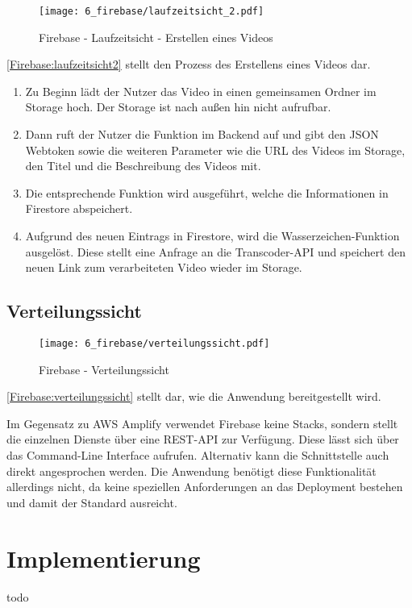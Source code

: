 \begin{figure}
  \centering
  \texttt{[image: 6\_firebase/laufzeitsicht\_2.pdf]}
  \caption{Firebase - Laufzeitsicht - Erstellen eines Videos}
  \label{Firebase:laufzeitsicht2}
\end{figure}

\autoref{Firebase:laufzeitsicht2} stellt den Prozess des Erstellens eines Videos dar.
\begin{enumerate}
  \item{Zu Beginn lädt der Nutzer das Video in einen gemeinsamen Ordner im Storage hoch. Der Storage ist nach außen hin nicht aufrufbar.}
  \item{Dann ruft der Nutzer die Funktion im Backend auf und gibt den JSON Webtoken sowie die weiteren Parameter wie die URL des Videos im Storage, den Titel und die Beschreibung des Videos mit.}
  \item{Die entsprechende Funktion wird ausgeführt, welche die Informationen in Firestore abspeichert.}
  \item{Aufgrund des neuen Eintrags in Firestore, wird die Wasserzeichen-Funktion ausgelöst. Diese stellt eine Anfrage an die Transcoder-API und speichert den neuen Link zum verarbeiteten Video wieder im Storage.}
\end{enumerate}

\subsection{Verteilungssicht}

\begin{figure}
  \centering
  \texttt{[image: 6\_firebase/verteilungssicht.pdf]}
  \caption{Firebase - Verteilungssicht}
  \label{Firebase:verteilungssicht}
\end{figure}

\autoref{Firebase:verteilungssicht} stellt dar, wie die Anwendung bereitgestellt wird.

Im Gegensatz zu \ac{AWS} Amplify verwendet Firebase keine Stacks, sondern stellt die einzelnen Dienste über eine REST-API zur Verfügung. Diese lässt sich über das Command-Line Interface aufrufen. Alternativ kann die Schnittstelle auch direkt angesprochen werden. Die Anwendung benötigt diese Funktionalität allerdings nicht, da keine speziellen Anforderungen an das Deployment bestehen und damit der Standard ausreicht.

\section{Implementierung}

todo